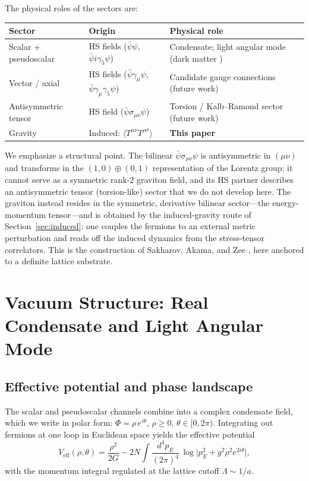 \documentclass[11pt,a4paper]{article}
\begin{document}
The physical roles of the sectors are:
\begin{center}
\begin{tabular}{lll}
\toprule
Sector & Origin & Physical role \\
\midrule
Scalar + pseudoscalar & HS fields ($\bar{\psi}\psi$,
  $\bar{\psi}i\gamma_5\psi$) & Condensate; light angular mode
  (dark matter \cite{Cheng:2025sparc}) \\
Vector / axial & HS fields ($\bar{\psi}\gamma_\mu\psi$,
  $\bar{\psi}\gamma_\mu\gamma_5\psi$) & Candidate gauge
  connections (future work) \\
Antisymmetric tensor & HS field ($\bar{\psi}\sigma_{\mu\nu}\psi$)
  & Torsion / Kalb--Ramond sector (future work) \\
Gravity & Induced: $\langle T^{\mu\nu}T^{\rho\sigma}\rangle$
  & \textbf{This paper} \\
\bottomrule
\end{tabular}
\end{center}

We emphasize a structural point.
The bilinear $\bar{\psi}\sigma_{\mu\nu}\psi$ is antisymmetric in
$(\mu\nu)$ and transforms in the $(1,0)\oplus(0,1)$ representation
of the Lorentz group; it cannot serve as a symmetric rank-2
graviton field, and its HS partner describes an antisymmetric
tensor (torsion-like) sector that we do not develop here.
The graviton instead resides in the symmetric, derivative bilinear
sector---the energy-momentum tensor---and is obtained by the
induced-gravity route of Section~\ref{sec:induced}: one couples
the fermions to an external metric perturbation and reads off the
induced dynamics from the stress-tensor correlators.
This is the construction of Sakharov, Akama, and Zee
\cite{Sakharov:1967pk,Akama:1978pg,Zee:1981}, here anchored to a
definite lattice substrate.


\section{Vacuum Structure: Real Condensate and Light Angular Mode}
\label{sec:vacuum}

\subsection{Effective potential and phase landscape}

The scalar and pseudoscalar channels combine into a complex
condensate field, which we write in polar form:
$\Phi = \rho\,e^{i\theta}$, $\rho \geq 0$, $\theta \in [0,2\pi)$.
Integrating out fermions at one loop in Euclidean space yields the
effective potential
\begin{equation}
V_{\mathrm{eff}}(\rho,\theta) = \frac{\rho^2}{2G}
- 2N\int \frac{d^4p_E}{(2\pi)^4}\,
\log\bigl|p_E^2 + g^2\rho^2 e^{2i\theta}\bigr|,
\label{eq:Veff}
\end{equation}
with the momentum integral regulated at the lattice cutoff
$\Lambda \sim 1/a$.
\end{document}
